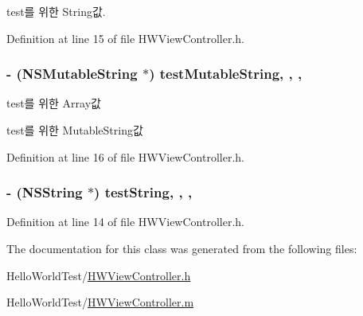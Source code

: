 test를 위한 String값. 



Definition at line 15 of file H\-W\-View\-Controller.\-h.

\hypertarget{interface_h_w_view_controller_a0ad2d93f9f72dfda058dc1d1812c8cc5}{
\subsubsection[{test\-Mutable\-String}]{\setlength{\rightskip}{0pt plus 5cm}-\/ (N\-S\-Mutable\-String $\ast$) test\-Mutable\-String\hspace{0.3cm}{\ttfamily [read]}, {\ttfamily [write]}, {\ttfamily [nonatomic]}, {\ttfamily [strong]}}}\label{interface_h_w_view_controller_a0ad2d93f9f72dfda058dc1d1812c8cc5}


test를 위한 Array값 

test를 위한 Mutable\-String값 

Definition at line 16 of file H\-W\-View\-Controller.\-h.

\hypertarget{interface_h_w_view_controller_a50f08c7a9f502535f04568c5b6cb1f42}{
\subsubsection[{test\-String}]{\setlength{\rightskip}{0pt plus 5cm}-\/ (N\-S\-String $\ast$) test\-String\hspace{0.3cm}{\ttfamily [read]}, {\ttfamily [write]}, {\ttfamily [nonatomic]}, {\ttfamily [strong]}}}\label{interface_h_w_view_controller_a50f08c7a9f502535f04568c5b6cb1f42}


Definition at line 14 of file H\-W\-View\-Controller.\-h.



The documentation for this class was generated from the following files\-:\begin{DoxyCompactItemize}
\item 
Hello\-World\-Test/\hyperlink{_h_w_view_controller_8h}{H\-W\-View\-Controller.\-h}\item 
Hello\-World\-Test/\hyperlink{_h_w_view_controller_8m}{H\-W\-View\-Controller.\-m}\end{DoxyCompactItemize}
